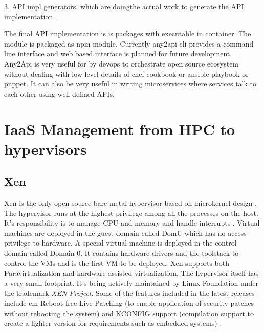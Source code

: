      3. API impl generators, which are doingthe actual work to
        generate the API implementation.

     The final API implementation \cite{www-any2api} is is packages
     with executable in container.  The module is packaged as npm
     module. Currently any2api-cli provides a command line interface
     and web based interface is planned for future
     development. Any2Api is very useful for by devops to orchestrate
     open source ecosystem without dealing with low level details of
     chef cookbook or ansible playbook or puppet. It can also be very
     useful in writing microservices where services talk to each other
     using well defined APIs.

\section{IaaS Management from HPC to hypervisors}
\label{S:o-hypervisors}

\subsection{Xen}

     Xen is the only open-source bare-metal hypervisor based on
     microkernel design \cite{www-xen-wikipedia}. The hypervisor runs
     at the highest privilege among all the processes on the
     host. It's responsibility is to manage CPU and memory and handle
     interrupts \cite{www-xen-overview}. Virtual machines are
     deployed in the guest domain called DomU which has no access
     privilege to hardware. A special virtual machine is deployed in
     the control domain called Domain 0. It contains hardware drivers
     and the toolstack to control the VMs and is the first VM to be
     deployed. Xen supports both Paravirtualization and hardware
     assisted virtualization. The hypervisor itself has a very small
     footprint. It's being actively maintained by Linux Foundation
     under the trademark \textit{XEN Project}. Some of the features included
     in the latest releases include {em Reboot-free Live Patching} (to
     enable application of security patches without rebooting the
     system) and KCONFIG support (compilation support to create a
     lighter version for requirements such as embedded systems)
     \cite{www-xen-fl}.
          
